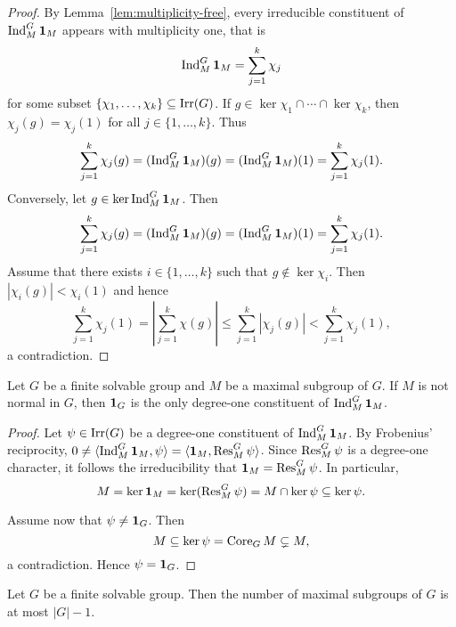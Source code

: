 \begin{proof}
    By Lemma~\ref{lem:multiplicity-free}, every irreducible constituent of 
    $\operatorname{Ind}_M^G\mathbf{1}_M$ appears with multiplicity one, that is 
    \[
    \operatorname{Ind}_M^G\mathbf{1}_M=\sum_{j=1}^k\chi_j
    \]
    for some subset $\{\chi_1,\dots,\chi_k\}\subseteq\operatorname{Irr}(G)$. If $g\in\ker\chi_1\cap\cdots\cap\ker\chi_k$, then
    $\chi_j(g)=\chi_j(1)$ for all $j\in\{1,\dots,k\}$. Thus 
    \[
    \sum_{j=1}^k\chi_j(g)=(\operatorname{Ind}_M^G\mathbf{1}_M)(g)=(\operatorname{Ind}_M^G\mathbf{1}_M)(1)=\sum_{j=1}^k\chi_j(1). 
    \]
    Conversely, let $g\in\ker\operatorname{Ind}_M^G\mathbf{1}_M$. 
    Then 
    \[
    \sum_{j=1}^k\chi_j(g)=(\operatorname{Ind}_M^G\mathbf{1}_M)(g)=(\operatorname{Ind}_M^G\mathbf{1}_M)(1)=\sum_{j=1}^k\chi_j(1).
    \]
    Assume that there exists 
    $i\in\{1,\dots,k\}$ such that 
    $g\not\in\ker\chi_i$. Then 
    $|\chi_i(g)|<\chi_i(1)$ and hence 
    \[
    \sum_{j=1}^k\chi_j(1)=\left|\sum_{j=1}^k\chi(g)\right|\leq
    \sum_{j=1}^k|\chi_j(g)|<\sum_{j=1}^k\chi_j(1),
    \]
    a contradiction. 
\end{proof}

\begin{lemma}
    Let $G$ be a finite solvable group and $M$ be a  
    maximal subgroup of $G$. If $M$ is not normal in $G$, 
    then $\mathbf{1}_G$ is the only degree-one constituent of $\operatorname{Ind}_M^G\mathbf{1}_M$. 
\end{lemma}

\begin{proof}
    Let $\psi\in\operatorname{Irr}(G)$ be a degree-one constituent of $\operatorname{Ind}_M^G\mathbf{1}_M$. 
    By Frobenius' reciprocity, $0\ne\langle\operatorname{Ind}_M^G\mathbf{1}_M,\psi\rangle=\langle\mathbf{1}_M,\operatorname{Res}_M^G\psi\rangle$.
    Since $\operatorname{Res}_M^G\psi$ is a degree-one character, it follows the irreducibility that 
    $\mathbf{1}_M=\operatorname{Res}_M^G\psi$. In particular, 
    \[
    M=\ker\mathbf{1}_M=\ker(\operatorname{Res}_M^G\psi)=M\cap\ker\psi\subseteq\ker\psi. 
    \]
    
    Assume now that $\psi\ne\mathbf{1}_G$. Then 
    \[
    M\subseteq \ker\psi=\operatorname{Core}_GM\subsetneq M,
    \]
    a contradiction. Hence $\psi=\mathbf{1}_G$. 
\end{proof}

\begin{theorem}[Wall]
\label{thm:Wall}
Let $G$ be a finite solvable group. Then the number of maximal subgroups of $G$ is at most $|G|-1$. 
\end{theorem}

